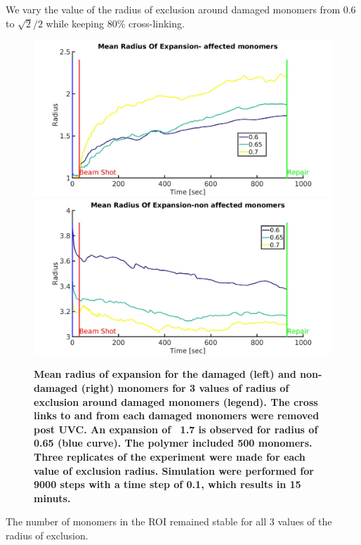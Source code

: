 \documentclass[12pt]{report}
\begin{document}
   We vary the value of the radius of exclusion around damaged monomers from 0.6 to $\sqrt{2}/2$ while keeping 80\% cross-linking. 
   
   
	\begin{figure}[H]
	\includegraphics[width=0.5\linewidth, height=0.3\textheight]{Images/ExludeAroundDamagedMonomers/BreakDamagedCrosslinks/06/meanRadiusOfExpansionAffected}
	\includegraphics[width=0.5\linewidth, height=0.3\textheight]{Images/ExludeAroundDamagedMonomers/BreakDamagedCrosslinks/06/meanRadiusOfExpansionNonAffected}
	\caption{\tiny{\textbf{Mean radius of expansion for the damaged (left) and non-damaged (right) monomers for 3 values of radius of exclusion around damaged monomers (legend). The cross links to and from each damaged monomers were removed post UVC. An expansion of ~1.7 is observed for radius of 0.65 (blue curve). The polymer included 500 monomers. Three replicates of the experiment were made for each value of exclusion radius. Simulation were performed for 9000 steps with a time step of 0.1, which results in 15 minuts.}}}
	\label{fig:meanRadiusOfExpansionAffectedVolumeOfExclusionParameterFitting}
	\end{figure}
   
   The number of monomers in the ROI remained stable for all 3 values of the radius of exclusion.
   
\end{document}
